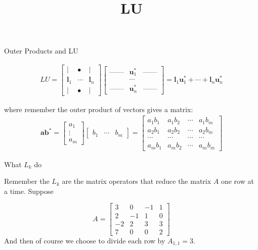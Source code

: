 \documentclass{beamer}
\title{LU}
\begin{document}
 
\begin{frame}
\maketitle
\end{frame}


\begin{frame}
{Outer Products and LU}

\begin{align}\label{we_want}
LU=\begin{bmatrix}
| & • & | \\ 
\mathbf{l}_1 & \cdots & \mathbf{l}_n \\ 
| & • & |
\end{bmatrix} 
\begin{bmatrix}
\text{---}\text{---} & \mathbf{u}_1^*& \text{---}\text{---} \\ 
  & \cdots &  \\ 
\text{---}\text{---} & \mathbf{u}_n^*& \text{---}\text{---}
\end{bmatrix} 
=\mathbf{l}_1 \mathbf{u}_1^*+\cdots + \mathbf{l}_n \mathbf{u}_n^*
\end{align}
\end{frame}

\begin{frame}

where remember the outer product of vectors gives a matrix:
\begin{align}\label{outer_product}
\mathbf{a} \mathbf{b}^*=\begin{bmatrix}
a_1 \\ 
\vdots \\ 
a_m
\end{bmatrix} 
\begin{bmatrix}
b_1 & \cdots & b_m 
\end{bmatrix} 
=\begin{bmatrix}
a_1 b_1 & a_1 b_2 & \cdots & a_1 b_m \\ 
a_2 b_1 & a_2 b_2 & \cdots & a_2 b_m \\ 
\cdots & \cdots & \cdots & \cdots \\ 
a_m b_1 & a_m b_2 & \cdots & a_m b_m
\end{bmatrix} 
\end{align}
\end{frame}


\begin{frame}
{What $L_k$ do}

Remember the $L_k$ are the matrix operators that reduce the matrix $A$ one row at a time. Suppose 

\begin{equation}
A=\left[\begin{array}{rrrr}
3 & 0 & -1 & 1 \\ 
2 & -1 & 1 & 0 \\ 
-2 & 2 & 3 & 3 \\ 
7 & 0 & 0 & 2
\end{array} \right]
\end{equation}
And then of course we choose to divide each row by $A_{1,1}=3$.
\end{frame}
\end{document}
